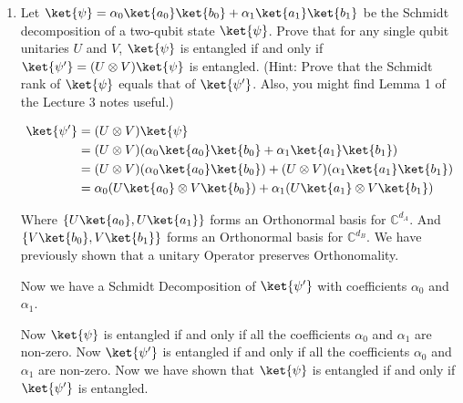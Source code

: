 \documentclass{article}
\begin{document}
\begin{enumerate}
  \item  Let $\ket{\psi}=\alpha_0\ket{a_0}\ket{b_0}+\alpha_1\ket{a_1}\ket{b_1}$ be the Schmidt decomposition of a two-qubit state $\ket{\psi}$. Prove that for any single qubit unitaries $U$ and $V$, $\ket{\psi}$ is entangled if and only if $\ket{\psi'}=(U\otimes V)\ket{\psi}$ is entangled. (Hint: Prove that the Schmidt rank of $\ket{\psi}$ equals that of $\ket{\psi'}$. Also, you might find Lemma 1 of the Lecture 3 notes useful.)


        $$\begin{aligned}
            \ket{\psi'} & =(U\otimes V)\ket{\psi}                                                            \\
                        & =(U\otimes V)(\alpha_0\ket{a_0}\ket{b_0}+\alpha_1\ket{a_1}\ket{b_1})               \\
                        & =(U\otimes V)(\alpha_0\ket{a_0}\ket{b_0})+(U\otimes V)(\alpha_1\ket{a_1}\ket{b_1}) \\
                        & =\alpha_0(U\ket{a_0}\otimes V\ket{b_0})+\alpha_1(U\ket{a_1}\otimes V\ket{b_1})     \\
          \end{aligned}$$

        Where $\{U\ket{a_0}, U\ket{a_1}\}$ forms an Orthonormal basis for $\mathbb{C}^{d_A}$.
        And $\{V\ket{b_0}, V\ket{b_1}\}$ forms an Orthonormal basis for $\mathbb{C}^{d_B}$.
        We have previously shown that a unitary Operator preserves Orthonomality.

        Now we have a Schmidt Decomposition of $\ket{\psi'}$ with coefficients $\alpha_0$ and $\alpha_1$.

        Now $\ket{\psi}$ is entangled if and only if all the coefficients $\alpha_0$ and $\alpha_1$ are non-zero.
        Now $\ket{\psi'}$ is entangled if and only if all the coefficients $\alpha_0$ and $\alpha_1$ are non-zero.
        Now we have shown that $\ket{\psi}$ is entangled if and only if $\ket{\psi'}$ is entangled.
\end{enumerate}
\end{document}
